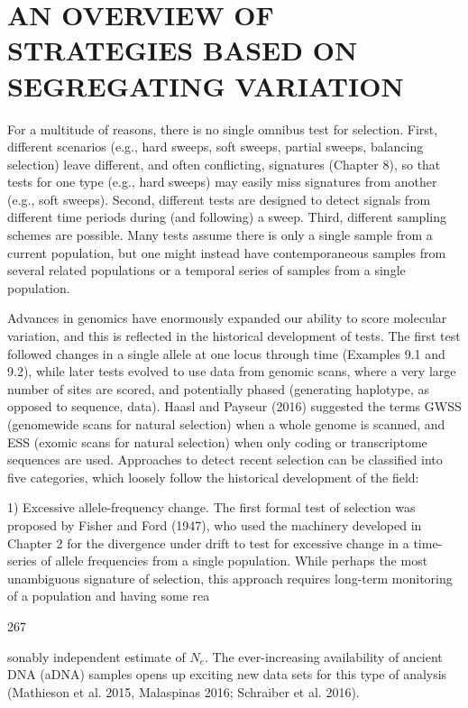 \documentclass{article}
\begin{document}
\section{AN OVERVIEW OF STRATEGIES BASED ON SEGREGATING VARIATION}
For a multitude of reasons, there is no single omnibus test for selection. First, different scenarios (e.g., hard sweeps, soft sweeps, partial sweeps, balancing selection) leave different, and often conflicting, signatures (Chapter 8), so that tests for one type (e.g., hard sweeps) may easily miss signatures from another (e.g., soft sweeps). Second, different tests are designed to detect signals from different time periods during (and following) a sweep. Third, different sampling schemes are possible. Many tests assume there is only a single sample from a current population, but one might instead have contemporaneous samples from several related populations or a temporal series of samples from a single population.

Advances in genomics have enormously expanded our ability to score molecular variation, and this is reflected in the historical development of tests. The first test followed changes in a single allele at one locus through time (Examples 9.1 and 9.2), while later tests evolved to use data from genomic scans, where a very large number of sites are scored, and potentially phased (generating haplotype, as opposed to sequence, data). Haasl and Payseur (2016) suggested the terms GWSS (genomewide scans for natural selection) when a whole genome is scanned, and ESS (exomic scans for natural selection) when only coding or transcriptome sequences are used. Approaches to detect recent selection can be classified into five categories, which loosely follow the historical development of the field:

1) Excessive allele-frequency change. The first formal test of selection was proposed by Fisher and Ford (1947), who used the machinery developed in Chapter 2 for the divergence under drift to test for excessive change in a time-series of allele frequencies from a single population. While perhaps the most unambiguous signature of selection, this approach requires long-term monitoring of a population and having some rea

267

sonably independent estimate of  $ N_{e} $. The ever-increasing availability of ancient DNA (aDNA) samples opens up exciting new data sets for this type of analysis (Mathieson et al. 2015, Malaspinas 2016; Schraiber et al. 2016).
\end{document}

